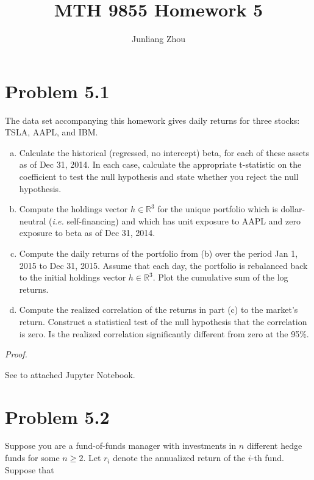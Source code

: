 \documentclass[a4paper]{article}
\title{MTH 9855 Homework 5}
\author{Junliang Zhou}
\begin{document}
\maketitle

\section{Problem 5.1}

The data set accompanying this homework gives daily returns for three stocks: TSLA, AAPL, and IBM.

\begin{enumerate}[(a)]
\item Calculate the historical (regressed, no intercept) beta, for each of these assets as of Dec 31, 2014. In each case, calculate the appropriate t-statistic on the coefficient to test the null hypothesis and state whether you reject the null hypothesis.

\item Compute the holdings vector $h\in\mathbb{R}^3$ for the unique portfolio which is dollar-neutral (\textit{i.e.} self-financing) and which has unit exposure to AAPL and zero exposure to beta as of Dec 31, 2014.

\item Compute the daily returns of the portfolio from (b) over the period Jan 1, 2015 to Dec 31, 2015. Assume that each day, the portfolio is rebalanced back to the initial holdings vector $h\in\mathbb{R}^3$. Plot the cumulative sum of the log returns.

\item Compute the realized correlation of the returns in part (c) to the market's return. Construct a statistical test of the null hypothesis that the correlation is zero. Is the realized  correlation significantly different from zero at the 95\%.
\end{enumerate}

\textit{Proof.}\newline

See to attached Jupyter Notebook.\newline

\section{Problem 5.2}

Suppose you are a fund-of-funds manager with investments in $n$ different hedge funds for some $n\geq 2$. Let $r_i$ denote the annualized return of the $i$-th fund. Suppose that
\end{document}

